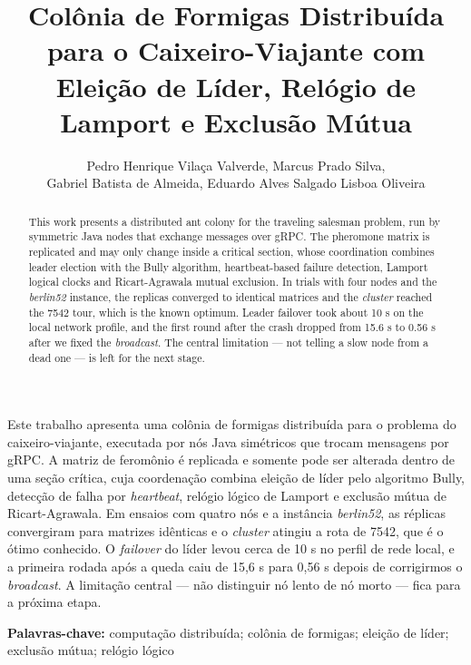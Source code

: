 \documentclass[12pt]{article}
\title{Col\^onia de Formigas Distribu\'ida para o Caixeiro-Viajante com Elei\c{c}\~ao de L\'ider, Rel\'ogio de Lamport e Exclus\~ao M\'utua}
\author{Pedro Henrique Vila\c{c}a Valverde\inst{1}, Marcus Prado Silva\inst{1},\\
Gabriel Batista de Almeida\inst{1}, Eduardo Alves Salgado Lisboa Oliveira\inst{1}}
\begin{document}
\maketitle

\begin{resumo}
Este trabalho apresenta uma colônia de formigas distribuída para o problema do
caixeiro-viajante, executada por nós Java simétricos que trocam mensagens por gRPC. A matriz de
feromônio é replicada e somente pode ser alterada dentro de uma seção crítica, cuja coordenação
combina eleição de líder pelo algoritmo Bully, detecção de falha por \textit{heartbeat}, relógio
lógico de Lamport e exclusão mútua de Ricart-Agrawala. Em ensaios com quatro nós e a instância
\textit{berlin52}, as réplicas convergiram para matrizes idênticas e o \textit{cluster} atingiu a
rota de 7542, que é o ótimo conhecido. O \textit{failover} do líder levou cerca de 10 s no perfil
de rede local, e a primeira rodada após a queda caiu de 15,6 s para 0,56 s depois de corrigirmos o
\textit{broadcast}. A limitação central --- não distinguir nó lento de nó morto --- fica para a
próxima etapa.
\end{resumo}

\begin{abstract}
This work presents a distributed ant colony for the traveling salesman problem, run by symmetric
Java nodes that exchange messages over gRPC. The pheromone matrix is replicated and may only change
inside a critical section, whose coordination combines leader election with the Bully algorithm,
heartbeat-based failure detection, Lamport logical clocks and Ricart-Agrawala mutual exclusion. In
trials with four nodes and the \textit{berlin52} instance, the replicas converged to identical
matrices and the \textit{cluster} reached the 7542 tour, which is the known optimum. Leader
failover took about 10 s on the local network profile, and the first round after the crash dropped
from 15.6 s to 0.56 s after we fixed the \textit{broadcast}. The central limitation --- not telling a
slow node from a dead one --- is left for the next stage.
\end{abstract}

\noindent\textbf{Palavras-chave:} computa\c{c}\~ao distribu\'ida; col\^onia de formigas;
elei\c{c}\~ao de l\'ider; exclus\~ao m\'utua; rel\'ogio l\'ogico








%    

\end{document}
